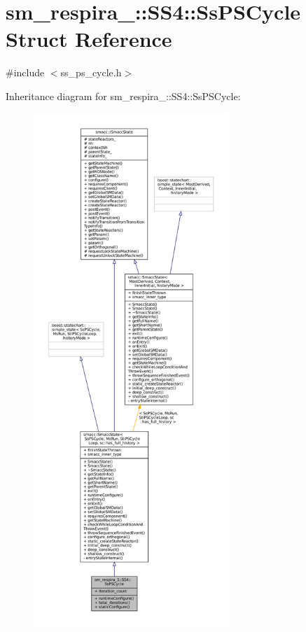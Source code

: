 \hypertarget{structsm__respira__1_1_1SS4_1_1SsPSCycle}{}\section{sm\+\_\+respira\+\_\+:\+:S\+S4\+:\+:Ss\+P\+S\+Cycle Struct Reference}
\label{structsm__respira__1_1_1SS4_1_1SsPSCycle}


{\ttfamily \#include $<$ss\+\_\+ps\+\_\+cycle.\+h$>$}



Inheritance diagram for sm\+\_\+respira\+\_\+:\+:S\+S4\+:\+:Ss\+P\+S\+Cycle\+:
\nopagebreak
\begin{figure}[H]
\begin{center}
\leavevmode
\includegraphics[height=550pt]{structsm__respira__1_1_1SS4_1_1SsPSCycle__inherit__graph}
\end{center}
\end{figure}


